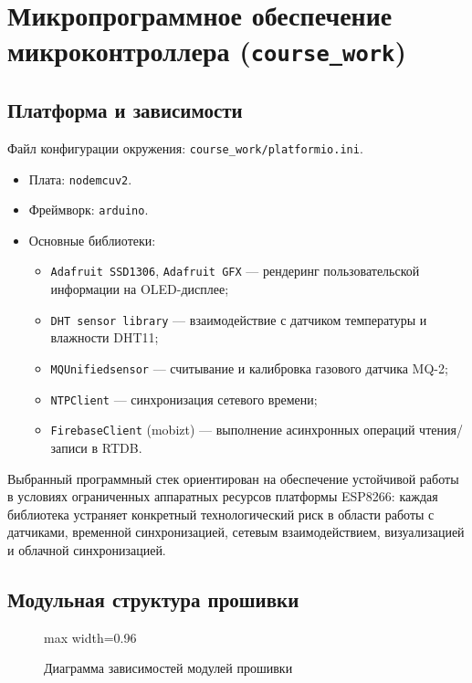 \section{Микропрограммное обеспечение микроконтроллера (\texttt{course\_work})}

\subsection{Платформа и зависимости}

Файл конфигурации окружения: \texttt{course\_work/platformio.ini}.

\begin{itemize}
    \item Плата: \texttt{nodemcuv2}.
    \item Фреймворк: \texttt{arduino}.
    \item Основные библиотеки:
    \begin{itemize}
        \item \texttt{Adafruit SSD1306}, \texttt{Adafruit GFX} --- рендеринг пользовательской информации на OLED-дисплее;
        \item \texttt{DHT sensor library} --- взаимодействие с датчиком температуры и влажности DHT11;
        \item \texttt{MQUnifiedsensor} --- считывание и калибровка газового датчика MQ-2;
        \item \texttt{NTPClient} --- синхронизация сетевого времени;
        \item \texttt{FirebaseClient} (mobizt) --- выполнение асинхронных операций чтения/записи в RTDB.
    \end{itemize}
\end{itemize}

Выбранный программный стек ориентирован на обеспечение устойчивой работы в условиях ограниченных аппаратных ресурсов платформы ESP8266: каждая библиотека устраняет конкретный технологический риск в области работы с датчиками, временной синхронизацией, сетевым взаимодействием, визуализацией и облачной синхронизацией.

\subsection{Модульная структура прошивки}

\begin{figure}[htbp]
\centering
\begin{adjustbox}{max width=0.96\textwidth}

\end{adjustbox}
\caption{Диаграмма зависимостей модулей прошивки}
\end{figure}


